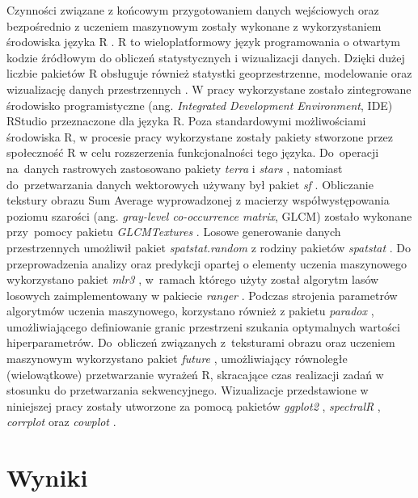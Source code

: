 \documentclass{amuthesis}
\begin{document}
Czynności związane z końcowym przygotowaniem danych wejściowych oraz
bezpośrednio z uczeniem maszynowym zostały wykonane z wykorzystaniem
środowiska języka R \autocite{R-base}. R to wieloplatformowy język
programowania o otwartym kodzie źródłowym do obliczeń statystycznych i
wizualizacji danych. Dzięki dużej liczbie pakietów R obsługuje również
statystki geoprzestrzenne, modelowanie oraz wizualizację danych
przestrzennych \autocite{lovelace_2019_geocomputation}. W pracy
wykorzystane zostało zintegrowane środowisko programistyczne (ang.
\emph{Integrated Development Environment}, IDE) RStudio
\autocite{rstudio_team_2020_rstudio} przeznaczone dla języka R. Poza
standardowymi możliwościami środowiska R, w procesie pracy wykorzystane
zostały pakiety stworzone przez społeczność R w celu rozszerzenia
funkcjonalności tego języka. Do~operacji na~danych rastrowych
zastosowano pakiety \emph{terra} \autocite{R-terra} i \emph{stars}
\autocite{R-stars}, natomiast do~przetwarzania danych wektorowych
używany był pakiet \emph{sf} \autocite{R-sf}. Obliczanie tekstury obrazu
Sum Average wyprowadzonej z macierzy współwystępowania poziomu szarości
(ang. \emph{gray-level co-occurrence matrix}, GLCM) zostało wykonane
przy~pomocy pakietu \emph{GLCMTextures} \autocite{R-GLCMTextures}.
Losowe generowanie danych przestrzennych umożliwił pakiet
\emph{spatstat.random} \autocite{R-spatstat.random} z rodziny pakietów
\emph{spatstat} \autocite{R-spatstat}. Do przeprowadzenia analizy oraz
predykcji opartej o elementy uczenia maszynowego wykorzystano pakiet
\emph{mlr3} \autocite{R-mlr3}, w~ramach którego użyty został algorytm
lasów losowych zaimplementowany w pakiecie \emph{ranger}
\autocite{R-ranger}. Podczas strojenia parametrów algorytmów uczenia
maszynowego, korzystano również z pakietu \emph{paradox}
\autocite{R-paradox}, umożliwiającego definiowanie granic przestrzeni
szukania optymalnych wartości hiperparametrów. Do~obliczeń związanych
z~teksturami obrazu oraz uczeniem maszynowym wykorzystano pakiet
\emph{future} \autocite{R-future}, umożliwiający równoległe
(wielowątkowe) przetwarzanie wyrażeń R, skracające czas realizacji zadań
w stosunku do przetwarzania sekwencyjnego. Wizualizacje przedstawione w
niniejszej pracy zostały utworzone za pomocą pakietów \emph{ggplot2}
\autocite{R-ggplot2}, \emph{spectralR} \autocite{R-spectralR},
\emph{corrplot} \autocite{R-corrplot} oraz \emph{cowplot}
\autocite{R-cowplot}.


\hypertarget{sec-wyniki}{%
\chapter{Wyniki}\label{sec-wyniki}}
\end{document}
